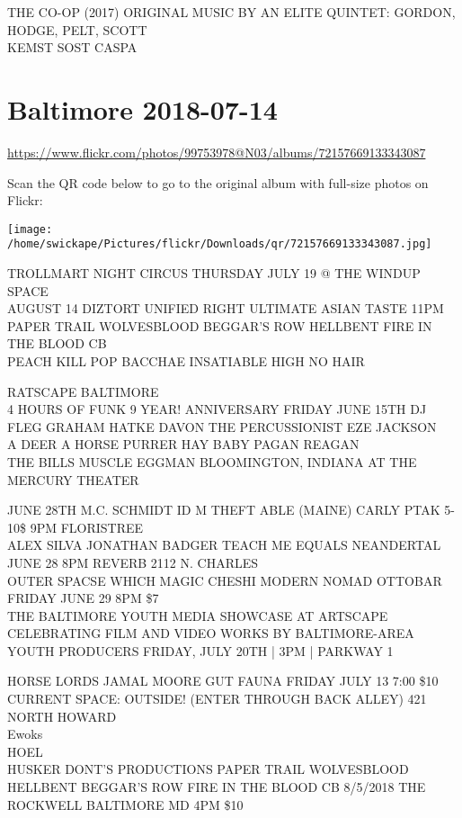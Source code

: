 \documentclass[10pt,letterpaper]{article}
\begin{document}
THE CO{-}OP (2017) ORIGINAL MUSIC BY AN ELITE QUINTET: GORDON, HODGE, PELT, SCOTT\\
KEMST SOST CASPA
\pagebreak

\section*{Baltimore 2018-07-14}

\url{https://www.flickr.com/photos/99753978@N03/albums/72157669133343087}

Scan the QR code below to go to the original album with full-size photos on Flickr:

\texttt{[image: /home/swickape/Pictures/flickr/Downloads/qr/72157669133343087.jpg]}
\pagebreak

TROLLMART NIGHT CIRCUS THURSDAY JULY 19 @ THE WINDUP SPACE\\
AUGUST 14 DIZTORT UNIFIED RIGHT ULTIMATE ASIAN TASTE 11PM\\
PAPER TRAIL WOLVESBLOOD BEGGAR'S ROW HELLBENT FIRE IN THE BLOOD CB\\
PEACH KILL POP BACCHAE INSATIABLE HIGH NO HAIR

RATSCAPE BALTIMORE\\
4 HOURS OF FUNK 9 YEAR! ANNIVERSARY FRIDAY JUNE 15TH DJ FLEG GRAHAM HATKE DAVON THE PERCUSSIONIST EZE JACKSON\\
A DEER A HORSE PURRER HAY BABY PAGAN REAGAN\\
THE BILLS MUSCLE EGGMAN BLOOMINGTON, INDIANA AT THE MERCURY THEATER

JUNE 28TH M.C. SCHMIDT ID M THEFT ABLE (MAINE) CARLY PTAK 5{-}10\$ 9PM FLORISTREE\\
ALEX SILVA JONATHAN BADGER TEACH ME EQUALS NEANDERTAL JUNE 28 8PM REVERB 2112 N. CHARLES\\
OUTER SPACSE WHICH MAGIC CHESHI MODERN NOMAD OTTOBAR FRIDAY JUNE 29 8PM \$7\\
THE BALTIMORE YOUTH MEDIA SHOWCASE AT ARTSCAPE CELEBRATING FILM AND VIDEO WORKS BY BALTIMORE{-}AREA YOUTH PRODUCERS FRIDAY, JULY 20TH | 3PM | PARKWAY 1

HORSE LORDS JAMAL MOORE GUT FAUNA FRIDAY JULY 13 7:00 \$10 CURRENT SPACE: OUTSIDE!  (ENTER THROUGH BACK ALLEY) 421 NORTH HOWARD\\
Ewoks\\
HOEL\\
HUSKER DONT'S PRODUCTIONS PAPER TRAIL WOLVESBLOOD HELLBENT BEGGAR'S ROW FIRE IN THE BLOOD CB 8/5/2018 THE ROCKWELL BALTIMORE MD 4PM \$10
\end{document}
